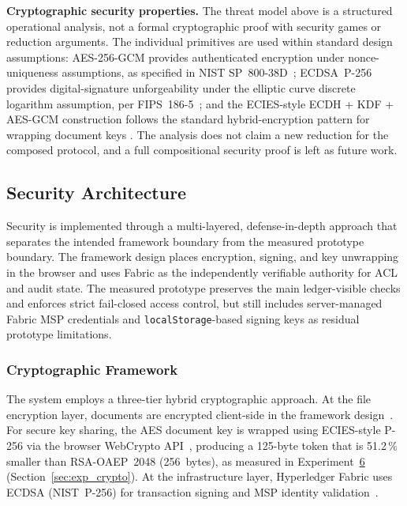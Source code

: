 \documentclass{ieeeaccess}
\begin{document}
\textbf{Cryptographic security properties.} The threat model above
is a structured operational analysis, not a formal cryptographic
proof with security games or reduction arguments. The individual
primitives are used within standard design assumptions: AES-256-GCM
provides authenticated encryption under nonce-uniqueness assumptions,
as specified in NIST SP~800-38D~\cite{nist80038d}; ECDSA~P-256
provides digital-signature unforgeability under the elliptic curve
discrete logarithm assumption, per FIPS~186-5~\cite{fips1865}; and
the ECIES-style ECDH + KDF + AES-GCM construction follows the
standard hybrid-encryption pattern for wrapping document keys
\cite{ieee1363a2004}. The analysis does not claim a new reduction
for the composed protocol, and a full compositional security proof is
left as future work.

\flushbottom
\subsection{Security Architecture}
\label{sec:security_arch}

Security is implemented through a multi-layered, defense-in-depth
approach that separates the intended
framework boundary from the measured prototype boundary. The
framework design places encryption, signing, and key unwrapping in
the browser and uses Fabric as the independently verifiable authority
for ACL and audit state. The measured prototype preserves the main ledger-visible checks and
enforces strict fail-closed access control, but still includes
server-managed Fabric MSP credentials and \texttt{localStorage}-based
signing keys as residual prototype limitations.

\subsubsection{Cryptographic Framework}
The system employs a three-tier hybrid cryptographic approach. At the
file encryption layer, documents are encrypted client-side in the
framework design~\cite{fips197}. For secure key sharing, the AES
document key is wrapped using ECIES-style P-256 via the browser WebCrypto
API~\cite{w3cWebCrypto}, producing a 125-byte token that is 51.2\,\%
smaller than RSA-OAEP~2048 (256~bytes), as measured in
Experiment~\hyperref[sec:exp_crypto]{6} (Section~\ref{sec:exp_crypto}). At the infrastructure
layer, Hyperledger Fabric uses ECDSA (NIST~P-256) for transaction
signing and MSP identity validation~\cite{fabricMSP,fips1865}.
\end{document}
